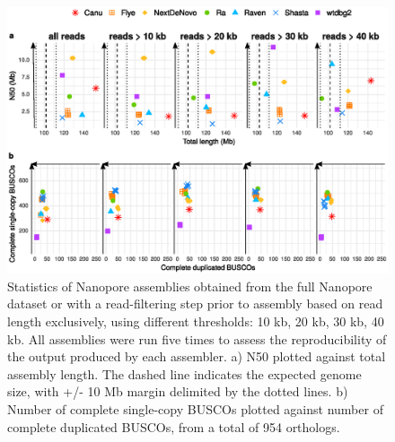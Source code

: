 \begin{suppsection}
    \begin{figure}[ht]
    \centering
     \includegraphics[width=13.5cm]{fig/benchmark/supp_nanopore_replicates.eps}
   \caption{Statistics of Nanopore assemblies obtained from the full Nanopore dataset or with a read-filtering step prior to assembly based on read length exclusively, using different thresholds: 10 kb, 20 kb, 30 kb, 40 kb. All assemblies were run five times to assess the reproducibility of the output produced by each assembler. a) N50 plotted against total assembly length. The dashed line indicates the expected genome size, with +/- 10 Mb margin delimited by the dotted lines. b) Number of complete single-copy BUSCOs plotted against number of complete duplicated BUSCOs, from a total of 954 orthologs.}
   \label{fig:nanopore_replicates}
 \end{figure}


\end{suppsection}
